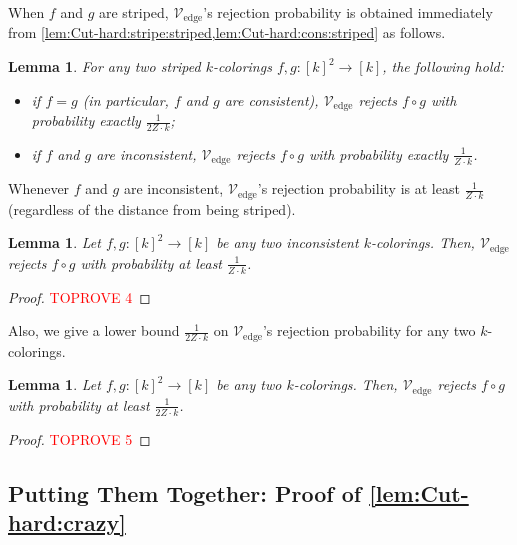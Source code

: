 \documentclass[11pt,fleqn]{article}
\newcommand{\V}{\calV}
\newcommand{\f}{f}
\newcommand{\g}{g}
\newcommand{\Vedge}{\V_\mathrm{edge}}
\newcommand{\calV}{\mathcal{V}}
\newtheorem{lemma}[theorem]{Lemma}
\theoremstyle{definition}
\numberwithin{equation}{section}
\begin{document}
When $\f$ and $\g$ are striped,
$\Vedge$'s rejection probability is obtained immediately 
from \cref{lem:Cut-hard:stripe:striped,lem:Cut-hard:cons:striped} as follows.
\begin{lemma}
\label{lem:Cut-hard:edge:striped}
For any two striped $k$-colorings $\f,\g \colon [k]^2 \to [k]$,
the following hold\textup{:}
\begin{itemize}
    \item if $\f = \g$ (in particular, $\f$ and $\g$ are consistent),
        $\Vedge$ rejects $\f \circ \g$ with probability exactly $\frac{1}{2Z \cdot k}$\textup{;}
    \item if $\f$ and $\g$ are inconsistent,
        $\Vedge$ rejects $\f \circ \g$ with probability exactly $\frac{1}{Z \cdot k}$.
\end{itemize}
\end{lemma}


Whenever $\f$ and $\g$ are inconsistent,
$\Vedge$'s rejection probability is at least $\frac{1}{Z \cdot k}$
(regardless of the distance from being striped).


\begin{lemma}
\label{lem:Cut-hard:edge:mismatch}
    Let $\f,\g \colon [k]^2 \to [k]$ be any two inconsistent $k$-colorings.
    Then, $\Vedge$ rejects $\f \circ \g$ with probability at least
    $\frac{1}{Z \cdot k}$.
\end{lemma}
\begin{proof}\textcolor{red}{TOPROVE 4}\end{proof}


Also, we give a lower bound $\frac{1}{2Z \cdot k}$ on $\Vedge$'s rejection probability for any two $k$-colorings.


\begin{lemma}
\label{lem:Cut-hard:edge:any}
    Let $\f,\g \colon [k]^2 \to [k]$ be any two $k$-colorings.
    Then, $\Vedge$ rejects $\f \circ \g$ with probability at least
    $\frac{1}{2Z \cdot k}$.
\end{lemma}
\begin{proof}\textcolor{red}{TOPROVE 5}\end{proof}


\subsection{Putting Them Together: Proof of \texorpdfstring{\cref{lem:Cut-hard:crazy}}{Lemma~\protect\ref{lem:Cut-hard:crazy}}}
\label{sec:Cut-hard:crazy}
\end{document}
